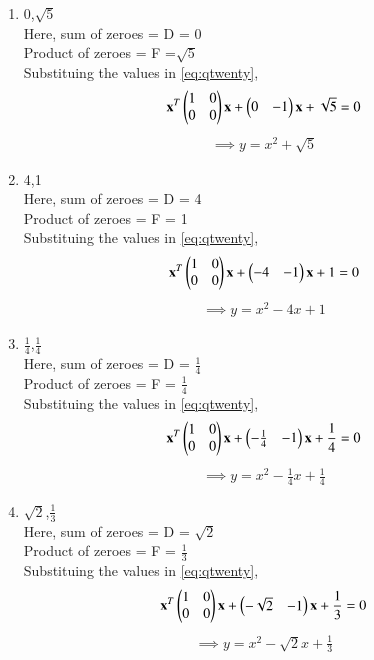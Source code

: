 \begin{enumerate}[label=\thesection.\arabic*.,ref=\thesection.\theenumi]
\begin{enumerate}
		\item 0,$\sqrt{5}$\\
		\solution
Here, sum of zeroes = D = 0\\
Product of zeroes = F =$\sqrt{5}$\\
Substituing the values in \ref{eq:qtwenty},\\
\begin{multline}
\mathbf{x}^T\begin{pmatrix}1&0\\0&0\end{pmatrix}\mathbf{x}  + \begin{pmatrix}0&-1\end{pmatrix}\mathbf{x} + \sqrt{5} = 0
\end{multline}
\begin{align}
\implies y = x^2 + \sqrt{5}  
\end{align}
		\item 4,1\\
		\solution 
Here, sum of zeroes = D = 4\\
Product of zeroes = F = 1\\
Substituing the values in \ref{eq:qtwenty},\\
\begin{multline}
\mathbf{x}^T\begin{pmatrix}1&0\\0&0\end{pmatrix}\mathbf{x}  + \begin{pmatrix}-4&-1\end{pmatrix}\mathbf{x} + 1 = 0
\end{multline}
\begin{align}
\implies y = x^2 - 4x + 1 
\end{align}


		\item $\frac{1}{4}$,$\frac{1}{4}$\\
\solution 
Here, sum of zeroes = D = $\frac{1}{4}$\\
Product of zeroes = F = $\frac{1}{4}$\\
Substituing the values in \ref{eq:qtwenty},\\

\begin{multline}
\mathbf{x}^T\begin{pmatrix}1&0\\0&0\end{pmatrix}\mathbf{x}  + \begin{pmatrix}-\frac{1}{4}&-1\end{pmatrix}\mathbf{x} + \frac{1}{4} = 0
\end{multline}
\begin{align}
\implies y = x^2 - \frac{1}{4}x + \frac{1}{4} 
\end{align}


		\item $\sqrt{2}$,$\frac{1}{3}$\\
\solution
Here, sum of zeroes = D = $\sqrt{2}$\\
Product of zeroes = F = $\frac{1}{3}$\\
Substituing the values in \ref{eq:qtwenty},\\
\begin{multline}
\mathbf{x}^T\begin{pmatrix}1&0\\0&0\end{pmatrix}\mathbf{x}  + \begin{pmatrix}-\sqrt{2}&-1\end{pmatrix}\mathbf{x} + \frac{1}{3} = 0
\end{multline}
\begin{align}
\implies y = x^2 - \sqrt{2}x + \frac{1}{3}
\end{align}
	\end{enumerate}
\end{enumerate}
